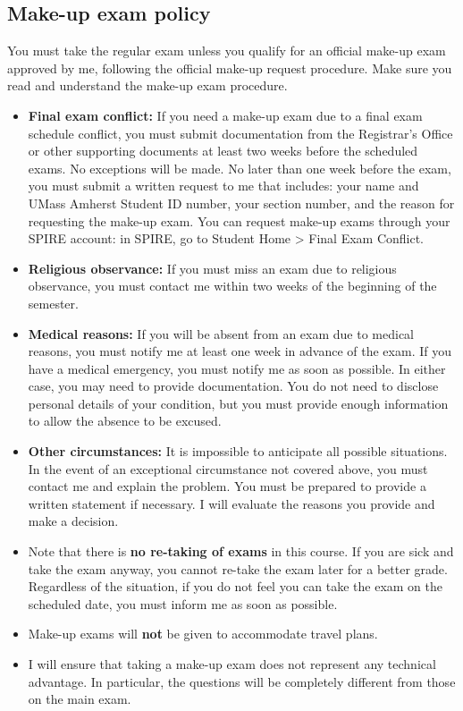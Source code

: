 \documentclass[11pt]{article}
\begin{document}
\subsection*{Make-up exam policy}
\label{sec:org1e50294}
You must take the regular exam unless you qualify for an official make-up exam
approved by me, following the official make-up request procedure. Make sure you
read and understand the make-up exam procedure.

\begin{itemize}
\item \textbf{Final exam conflict:} If you need a make-up exam due to a final exam
schedule conflict, you must submit documentation from the Registrar's Office
or other supporting documents at least two weeks before the scheduled exams.
No exceptions will be made. No later than one week before the exam, you must
submit a written request to me that includes: your name and UMass Amherst
Student ID number, your section number, and the reason for requesting the
make-up exam. You can request make-up exams through your SPIRE account: in
SPIRE, go to Student Home > Final Exam Conflict.

\item \textbf{Religious observance:} If you must miss an exam due to religious observance,
you must contact me within two weeks of the beginning of the semester.

\item \textbf{Medical reasons:} If you will be absent from an exam due to medical reasons,
you must notify me at least one week in advance of the exam. If you have a
medical emergency, you must notify me as soon as possible. In either case,
you may need to provide documentation. You do not need to disclose personal
details of your condition, but you must provide enough information to allow
the absence to be excused.

\item \textbf{Other circumstances:} It is impossible to anticipate all possible
situations. In the event of an exceptional circumstance not covered above,
you must contact me and explain the problem. You must be prepared to provide
a written statement if necessary. I will evaluate the reasons you provide and
make a decision.

\item Note that there is \textbf{no re-taking of exams} in this course. If you are sick
and take the exam anyway, you cannot re-take the exam later for a better
grade. Regardless of the situation, if you do not feel you can take the exam
on the scheduled date, you must inform me as soon as possible.

\item Make-up exams will \textbf{not} be given to accommodate travel plans.

\item I will ensure that taking a make-up exam does not represent any technical
advantage. In particular, the questions will be completely different from
those on the main exam.
\end{itemize}
\end{document}
